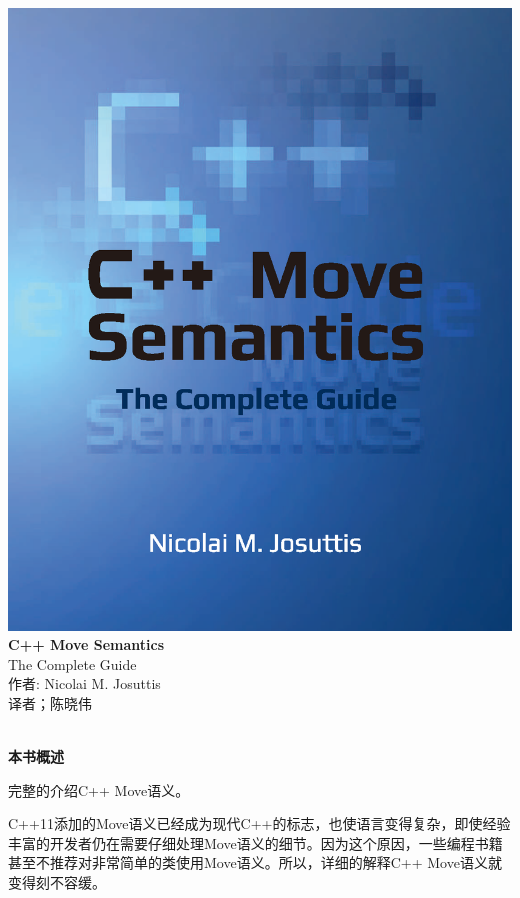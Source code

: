 \documentclass[11pt,a4paper,UTF8]{ctexart}
\begin{document}
	
	\begin{center}
		\includegraphics[width=1.\textwidth]{cover}
		\newpage
		\huge
		\textbf{C++ Move Semantics} 
		\\[9pt]
		\normalsize
		The Complete Guide
		\\[10pt]
		\normalsize 
		作者: Nicolai M. Josuttis
		\\[8pt]
		\normalsize
		译者；陈晓伟
	\end{center}
	
	\hspace*{\fill} \\ %
	\noindent\textbf{本书概述}\ \par

	完整的介绍C++ Move语义。\par
	
	C++11添加的Move语义已经成为现代C++的标志，也使语言变得复杂，即使经验丰富的开发者仍在需要仔细处理Move语义的细节。因为这个原因，一些编程书籍甚至不推荐对非常简单的类使用Move语义。所以，详细的解释C++ Move语义就变得刻不容缓。\par
	
\end{document}

